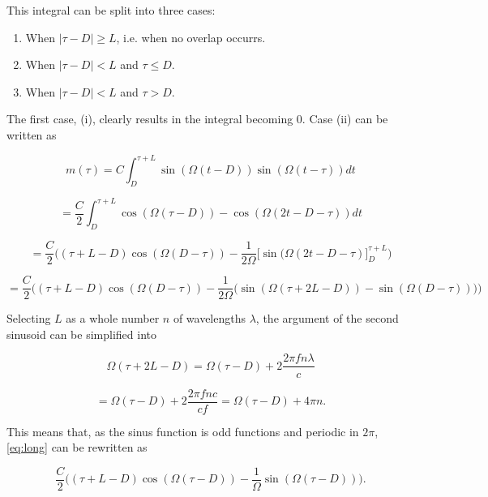 \begin{appendices}
This integral can be split into three cases:

\begin{enumerate}[label=(\roman*)]
	\item When $|\tau-D| \geq L$, i.e. when no overlap occurrs. 
	\item When $|\tau-D| < L$ and $\tau \leq D$.
	\item When $|\tau-D| < L$ and $\tau > D$.
\end{enumerate}

The first case, (i), clearly results in the integral becoming 0. Case (ii) can be written as

\begin{equation}
	m(\tau)
	= C\int_{D}^{\tau+L}\sin(\Omega(t-D))\sin(\Omega(t-\tau))dt
\end{equation}

\begin{equation}
	= \frac{C}{2}\int_D^{\tau+L} \cos(\Omega(\tau-D)) - \cos(\Omega(2t - D - \tau))dt
\end{equation}

\begin{equation}
	= \frac{C}{2}\Big( (\tau+L-D)\cos(\Omega(D-\tau)) 
	- \frac{1}{2\Omega}\Big[ \sin(\Omega(2t-D-\tau) \Big]_{D}^{\tau+L} \Big)
\end{equation}

\begin{equation}\label{eq:long}
	= \frac{C}{2}\Big((\tau + L - D)\cos(\Omega(D-\tau))
	- \frac{1}{2\Omega}\big(
	\sin(\Omega(\tau + 2L - D))
	- \sin(\Omega(D-\tau))
	\big)\Big)
\end{equation}

Selecting $L$ as a whole number $n$ of wavelengths $\lambda$, the argument of the second sinusoid can be simplified into

\begin{equation}
	\Omega(\tau + 2L - D) 
	= \Omega(\tau - D) + 2\frac{2\pi f n\lambda}{c} 
\end{equation}

\begin{equation}
	= \Omega(\tau - D) + 2\frac{2\pi f n c}{c f}
	= \Omega(\tau - D) + 4\pi n.
\end{equation}

This means that, as the sinus function is odd functions and periodic in $2\pi$, \ref{eq:long} can be rewritten as 

\begin{equation}\label{eq:first}
	 \frac{C}{2}\Big( (\tau+L-D)\cos(\Omega(\tau - D)) 
	- \frac{1}{\Omega}\sin(\Omega(\tau - D))\Big).
\end{equation}


\end{appendices}
